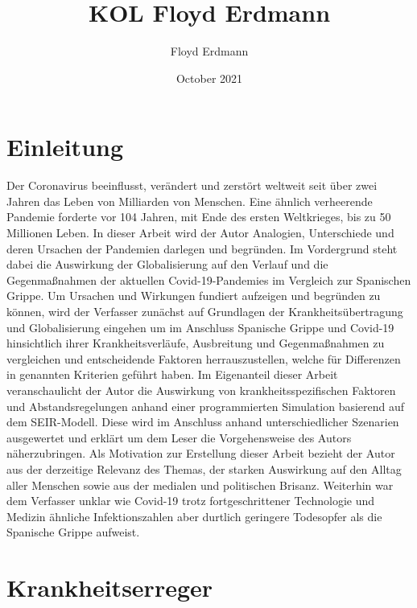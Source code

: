 \documentclass[12pt]{article}
\title{KOL Floyd Erdmann}
\author{Floyd Erdmann}
\date{October 2021}
\begin{document}
\setlength{\baselineskip}{5mm}
\maketitle
\onehalfspacing

\newpage
\tableofcontents
\newpage
\listoffigures
\lstlistoflistings
\newpage
{}
\setcounter{page}{5}
\section{Einleitung}
Der Coronavirus beeinflusst, verändert und zerstört weltweit seit über zwei Jahren das Leben von Milliarden von Menschen. Eine ähnlich verheerende Pandemie forderte vor 104 Jahren, mit Ende des ersten Weltkrieges, bis zu 50 Millionen Leben. In dieser Arbeit wird der Autor Analogien, Unterschiede und deren Ursachen der Pandemien darlegen und begründen. Im Vordergrund steht dabei die Auswirkung der Globalisierung auf den Verlauf und die Gegenmaßnahmen der aktuellen Covid-19-Pandemies im Vergleich zur Spanischen Grippe. Um Ursachen und Wirkungen fundiert aufzeigen und begründen zu können, wird der Verfasser zunächst auf Grundlagen der Krankheitsübertragung und Globalisierung eingehen um im Anschluss Spanische Grippe und Covid-19 hinsichtlich ihrer Krankheitsverläufe, Ausbreitung und Gegenmaßnahmen zu vergleichen und entscheidende Faktoren herrauszustellen, welche für Differenzen in genannten Kriterien geführt haben. Im Eigenanteil dieser Arbeit veranschaulicht der Autor die Auswirkung von krankheitsspezifischen Faktoren und Abstandsregelungen anhand einer programmierten Simulation basierend auf dem SEIR-Modell. Diese wird im Anschluss anhand unterschiedlicher Szenarien ausgewertet und erklärt um dem Leser die Vorgehensweise des Autors näherzubringen. Als Motivation zur Erstellung dieser Arbeit bezieht der Autor aus der derzeitige Relevanz des Themas, der starken Auswirkung auf den Alltag aller Menschen sowie aus der medialen und politischen Brisanz. Weiterhin war dem Verfasser unklar wie Covid-19 trotz fortgeschrittener Technologie und Medizin ähnliche Infektionszahlen aber durtlich geringere Todesopfer als die Spanische Grippe aufweist.

\newpage
\section{Krankheitserreger}\label{sec:Krankheitserreger}
\end{document}
